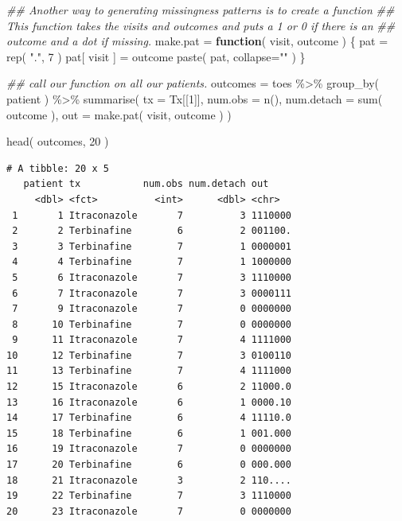\documentclass[
  letterpaper,
  DIV=11,
  numbers=noendperiod]{scrreprt}
\newenvironment{Shaded}{\begin{snugshade}}{\end{snugshade}}
\newcommand{\AttributeTok}[1]{\textcolor[rgb]{0.49,0.56,0.16}{#1}}
\newcommand{\ControlFlowTok}[1]{\textcolor[rgb]{0.00,0.44,0.13}{\textbf{#1}}}
\newcommand{\DecValTok}[1]{\textcolor[rgb]{0.25,0.63,0.44}{#1}}
\newcommand{\DocumentationTok}[1]{\textcolor[rgb]{0.73,0.13,0.13}{\textit{#1}}}
\newcommand{\FunctionTok}[1]{\textcolor[rgb]{0.02,0.16,0.49}{#1}}
\newcommand{\NormalTok}[1]{\textcolor[rgb]{0.00,0.44,0.13}{#1}}
\newcommand{\OtherTok}[1]{\textcolor[rgb]{0.00,0.44,0.13}{#1}}
\newcommand{\SpecialCharTok}[1]{\textcolor[rgb]{0.25,0.44,0.63}{#1}}
\newcommand{\StringTok}[1]{\textcolor[rgb]{0.25,0.44,0.63}{#1}}
\begin{document}
\begin{Shaded}
\begin{Highlighting}[]
\DocumentationTok{\#\# Another way to generating missingness patterns is to create a function}
\DocumentationTok{\#\# This function takes the visits and outcomes and puts a 1 or 0 if there is an}
\DocumentationTok{\#\# outcome and a dot if missing.}
\NormalTok{make.pat }\OtherTok{=} \ControlFlowTok{function}\NormalTok{( visit, outcome ) \{}
\NormalTok{    pat }\OtherTok{=} \FunctionTok{rep}\NormalTok{( }\StringTok{"."}\NormalTok{, }\DecValTok{7}\NormalTok{ )}
\NormalTok{    pat[ visit ] }\OtherTok{=}\NormalTok{ outcome}
    \FunctionTok{paste}\NormalTok{( pat, }\AttributeTok{collapse=}\StringTok{""}\NormalTok{ )}
\NormalTok{\}}

\DocumentationTok{\#\# call our function on all our patients.}
\NormalTok{outcomes }\OtherTok{=}\NormalTok{ toes }\SpecialCharTok{\%\textgreater{}\%} \FunctionTok{group\_by}\NormalTok{( patient ) }\SpecialCharTok{\%\textgreater{}\%}
    \FunctionTok{summarise}\NormalTok{( }\AttributeTok{tx =}\NormalTok{ Tx[[}\DecValTok{1}\NormalTok{]],}
               \AttributeTok{num.obs =} \FunctionTok{n}\NormalTok{(),}
               \AttributeTok{num.detach =} \FunctionTok{sum}\NormalTok{( outcome ),}
               \AttributeTok{out =} \FunctionTok{make.pat}\NormalTok{( visit, outcome ) )}

\FunctionTok{head}\NormalTok{( outcomes, }\DecValTok{20}\NormalTok{ )}
\end{Highlighting}
\end{Shaded}

\begin{verbatim}
# A tibble: 20 x 5
   patient tx           num.obs num.detach out    
     <dbl> <fct>          <int>      <dbl> <chr>  
 1       1 Itraconazole       7          3 1110000
 2       2 Terbinafine        6          2 001100.
 3       3 Terbinafine        7          1 0000001
 4       4 Terbinafine        7          1 1000000
 5       6 Itraconazole       7          3 1110000
 6       7 Itraconazole       7          3 0000111
 7       9 Itraconazole       7          0 0000000
 8      10 Terbinafine        7          0 0000000
 9      11 Itraconazole       7          4 1111000
10      12 Terbinafine        7          3 0100110
11      13 Terbinafine        7          4 1111000
12      15 Itraconazole       6          2 11000.0
13      16 Itraconazole       6          1 0000.10
14      17 Terbinafine        6          4 11110.0
15      18 Terbinafine        6          1 001.000
16      19 Itraconazole       7          0 0000000
17      20 Terbinafine        6          0 000.000
18      21 Itraconazole       3          2 110....
19      22 Terbinafine        7          3 1110000
20      23 Itraconazole       7          0 0000000
\end{verbatim}
\end{document}
